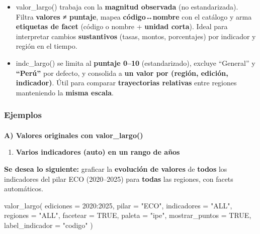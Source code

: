 \documentclass[
  11pt,
  letterpaper,
  DIV=11,
  numbers=noendperiod]{scrartcl}
\makeatletter
\let\oldparagraph\paragraph
\renewcommand{\paragraph}{
    \@ifstar
      \xxxParagraphStar
      \xxxParagraphNoStar
  }
\newcommand{\xxxParagraphStar}[1]{\oldparagraph*{#1}\mbox{}}
\newcommand{\xxxParagraphNoStar}[1]{\oldparagraph{#1}\mbox{}}
\newenvironment{Shaded}{\begin{snugshade}}{\end{snugshade}}
\newcommand{\AttributeTok}[1]{\textcolor[rgb]{0.40,0.45,0.13}{#1}}
\newcommand{\ConstantTok}[1]{\textcolor[rgb]{0.56,0.35,0.01}{#1}}
\newcommand{\DecValTok}[1]{\textcolor[rgb]{0.68,0.00,0.00}{#1}}
\newcommand{\FunctionTok}[1]{\textcolor[rgb]{0.28,0.35,0.67}{#1}}
\newcommand{\NormalTok}[1]{\textcolor[rgb]{0.00,0.23,0.31}{#1}}
\newcommand{\SpecialCharTok}[1]{\textcolor[rgb]{0.37,0.37,0.37}{#1}}
\newcommand{\StringTok}[1]{\textcolor[rgb]{0.13,0.47,0.30}{#1}}
\providecommand{\tightlist}{%
  \setlength{\itemsep}{0pt}\setlength{\parskip}{0pt}}\usepackage{longtable,booktabs,array}
\makeatother
\begin{document}
\begin{itemize}
\item
  valor\_largo() trabaja con la \textbf{magnitud observada} (no
  estandarizada). Filtra \textbf{valores ≠ puntaje}, mapea
  \textbf{código↔nombre} con el catálogo y arma \textbf{etiquetas de
  facet} (código o nombre + \textbf{unidad corta}). Ideal para
  interpretar cambios \textbf{sustantivos} (tasas, montos, porcentajes)
  por indicador y región en el tiempo.
\item
  indc\_largo() se limita al \textbf{puntaje 0--10} (estandarizado),
  excluye ``General'' y \textbf{``Perú''} por defecto, y consolida a
  \textbf{un valor por (región, edición, indicador)}. Útil para comparar
  \textbf{trayectorias relativas} entre regiones manteniendo la
  \textbf{misma escala}.
\end{itemize}

\subsubsection{\texorpdfstring{\textbf{Ejemplos}}{Ejemplos}}\label{ejemplos-12}

\paragraph{\texorpdfstring{\textbf{A) Valores originales con
valor\_largo()}}{A) Valores originales con valor\_largo()}}\label{a-valores-originales-con-valor_largo}

\begin{enumerate}
\def\labelenumi{\arabic{enumi}.}
\tightlist
\item
  \textbf{Varios indicadores (auto) en un rango de años}
\end{enumerate}

\textbf{Se desea lo siguiente:} graficar la \textbf{evolución de
valores} de \textbf{todos} los indicadores del pilar ECO (2020--2025)
para \textbf{todas} las regiones, con facets automáticos.

\begin{Shaded}
\begin{Highlighting}[]
\FunctionTok{valor\_largo}\NormalTok{(}
  \AttributeTok{ediciones      =} \DecValTok{2020}\SpecialCharTok{:}\DecValTok{2025}\NormalTok{,}
  \AttributeTok{pilar          =} \StringTok{"ECO"}\NormalTok{,}
  \AttributeTok{indicadores    =} \StringTok{"ALL"}\NormalTok{,}
  \AttributeTok{regiones       =} \StringTok{"ALL"}\NormalTok{,}
  \AttributeTok{facetear       =} \ConstantTok{TRUE}\NormalTok{,}
  \AttributeTok{paleta         =} \StringTok{"ipe"}\NormalTok{,}
  \AttributeTok{mostrar\_puntos =} \ConstantTok{TRUE}\NormalTok{,}
  \AttributeTok{label\_indicador =} \StringTok{"codigo"}
\NormalTok{)}
\end{Highlighting}
\end{Shaded}
\end{document}

